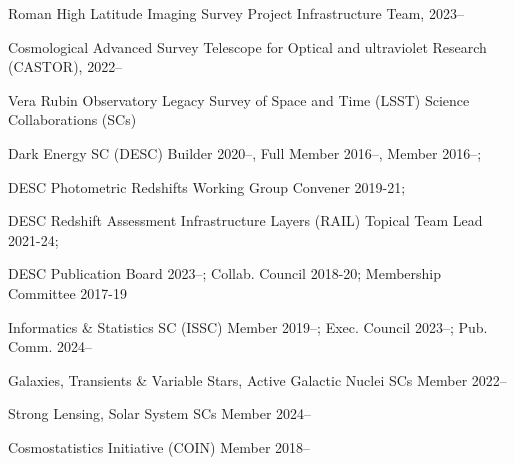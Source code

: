 \documentclass[11pt,letterpaper]{article}
\begin{document}
%

\begin{list}{}{\malzlist}
	\item Roman High Latitude Imaging Survey Project Infrastructure Team, 2023--
	\item Cosmological Advanced Survey Telescope for Optical and ultraviolet Research (CASTOR), 2022--
	\item Vera Rubin Observatory Legacy Survey of Space and Time (LSST) Science Collaborations (SCs)
	\begin{list}{}{\malzlist}
		\item Dark Energy SC (DESC) Builder 2020--, Full Member 2016--, Member 2016--;
		\item DESC Photometric Redshifts Working Group Convener 2019-21; 
		\item DESC Redshift Assessment Infrastructure Layers (RAIL) Topical Team Lead 2021-24;
		\item DESC Publication Board 2023--; Collab. Council 2018-20; Membership Committee 2017-19
		\item Informatics \& Statistics SC (ISSC) Member 2019--; Exec. Council 2023--; Pub. Comm. 2024--%
		\item Galaxies, Transients \& Variable Stars, Active Galactic Nuclei SCs  Member 2022--
		\item Strong Lensing, Solar System SCs Member 2024--
	\end{list}
	\item Cosmostatistics Initiative (COIN) Member 2018--
\end{list}
\end{document}
